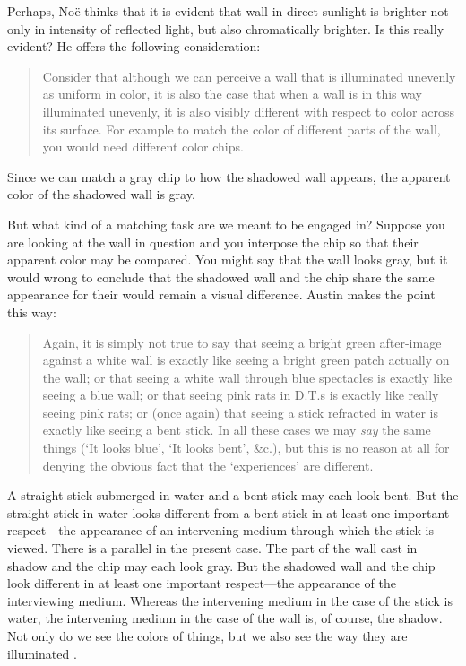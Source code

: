 \documentclass[12pt]{article}
\begin{document}
Perhaps, Noë thinks that it is evident that wall in direct sunlight is brighter not only in intensity of reflected light, but also chromatically brighter. Is this really evident? He offers the following consideration:
	\begin{quote}
		Consider that although we can perceive a wall that is illuminated unevenly as uniform in color, it is also the case that when a wall is in this way illuminated unevenly, it is also visibly different with respect to color across its surface. For example to match the color of different parts of the wall, you would need different color chips. \citep[128]{Noe:2004fk}
	\end{quote}
Since we can match a gray chip to how the shadowed wall appears, the apparent color of the shadowed wall is gray. 

But what kind of a matching task are we meant to be engaged in? Suppose you are looking at the wall in question and you interpose the chip so that their apparent color may be compared. You might say that the wall looks gray, but it would wrong to conclude that the shadowed wall and the chip share the same appearance for their would remain a visual difference. Austin makes the point this way:
	\begin{quote}
		Again, it is simply not true to say that seeing a bright green after-image against a white wall is exactly like seeing a bright green patch actually on the wall; or that seeing a white wall through blue spectacles is exactly like seeing a blue wall; or that seeing pink rats in D.T.s is exactly like really seeing pink rats; or (once again) that seeing a stick refracted in water is exactly like seeing a bent stick. In all these cases we may \emph{say} the same things (`It looks blue', `It looks bent', \&c.), but this is no reason at all for denying the obvious fact that the `experiences' are different. \citep[49]{Austin:1962lr}
	\end{quote}

A straight stick submerged in water and a bent stick may each look bent. But the straight stick in water looks different from a bent stick in at least one important respect---the appearance of an intervening medium through which the stick is viewed. There is a parallel in the present case. The part of the wall cast in shadow and the chip may each look gray. But the shadowed wall and the chip look different in at least one important respect---the appearance of the interviewing medium. Whereas the intervening medium in the case of the stick is water, the intervening medium in the case of the wall is, of course, the shadow. Not only do we see the colors of things, but we also see the way they are illuminated \citep[see][]{Hilbert:2007qy}.
\end{document}
